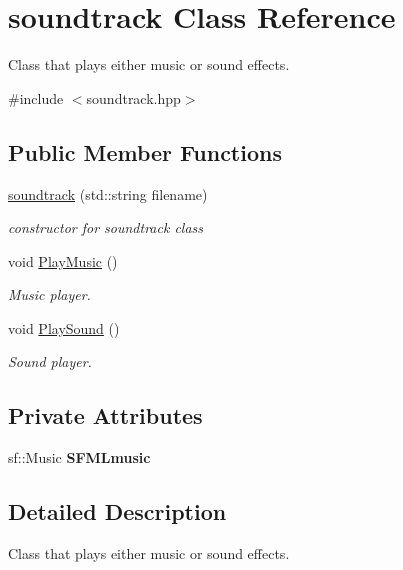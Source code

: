 \hypertarget{classsoundtrack}{}\section{soundtrack Class Reference}
\label{classsoundtrack}


Class that plays either music or sound effects.  




{\ttfamily \#include $<$soundtrack.\+hpp$>$}

\subsection*{Public Member Functions}
\begin{DoxyCompactItemize}
\item 
\hyperlink{classsoundtrack_add31bdeb1a693d541443f1d88586d3b6}{soundtrack} (std\+::string filename)
\begin{DoxyCompactList}\small\item\em constructor for soundtrack class \end{DoxyCompactList}\item 
void \hyperlink{classsoundtrack_a9bc49316f0c8607aef388728d2ca28db}{Play\+Music} ()
\begin{DoxyCompactList}\small\item\em Music player. \end{DoxyCompactList}\item 
void \hyperlink{classsoundtrack_a3c86452d68b41eea981d0df4984713e8}{Play\+Sound} ()
\begin{DoxyCompactList}\small\item\em Sound player. \end{DoxyCompactList}\end{DoxyCompactItemize}
\subsection*{Private Attributes}
\begin{DoxyCompactItemize}
\item 
\mbox{\label{classsoundtrack_ae1db63c6fe8c2f2111c693bd543e921c}} 
sf\+::\+Music {\bfseries S\+F\+M\+Lmusic}
\end{DoxyCompactItemize}


\subsection{Detailed Description}
Class that plays either music or sound effects. 

